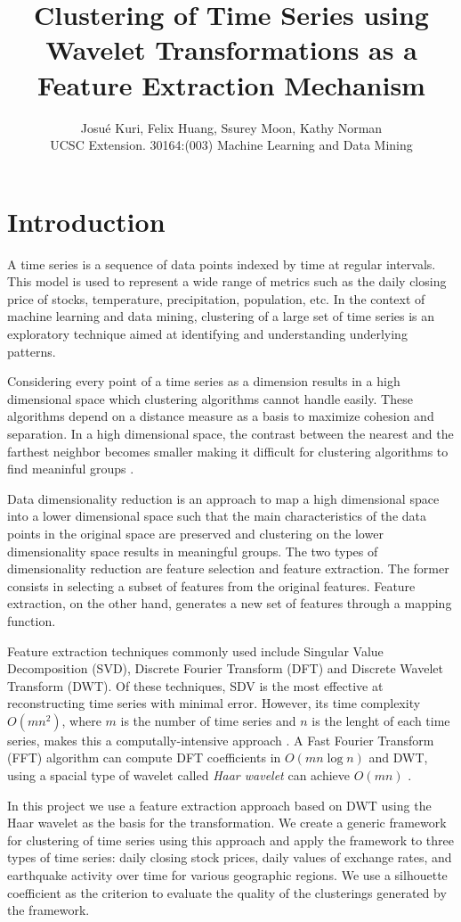 \documentclass{article}
\title{Clustering of Time Series using Wavelet Transformations as a Feature Extraction Mechanism}
\author{\textsf{Josu\'e Kuri, Felix Huang, Ssurey Moon, Kathy Norman}\\UCSC Extension. 30164:(003) Machine Learning and Data Mining}
\begin{document}
\maketitle

\section{Introduction}
A time series is a sequence of data points indexed by time at regular intervals. This model is used to represent a wide range of metrics such as the daily closing price of stocks, temperature, precipitation, population, etc. In the context of machine learning and data mining, clustering of a large set of time series is an exploratory technique aimed at identifying and understanding underlying patterns.

Considering every point of a time series as a dimension results in a high dimensional space which clustering algorithms cannot handle easily. These algorithms depend on a distance measure as a basis to maximize cohesion and separation. In a high dimensional space, the contrast between the nearest and the farthest neighbor becomes smaller making it difficult for clustering algorithms to find meaninful groups \cite{BGRS99}.

Data dimensionality reduction is an approach to map a high dimensional space into a lower dimensional space such that the main characteristics of the data points in the original space are preserved and clustering on the lower dimensionality space results in meaningful groups. The two types of dimensionality reduction are feature selection and feature extraction. The former consists in selecting a subset of features from the original features. Feature extraction, on the other hand, generates a new set of features through a mapping function.

Feature extraction techniques commonly used include Singular Value Decomposition (SVD), Discrete Fourier Transform (DFT) and Discrete Wavelet Transform (DWT). Of these techniques, SDV is the most effective at reconstructing time series with minimal error. However, its time complexity $O(mn^2)$, where $m$ is the number of time series and $n$ is the lenght of each time series, makes this a computally-intensive approach \cite{ZHZL06}. A Fast Fourier Transform (FFT) algorithm can compute DFT coefficients in $O(mn \log n)$ and DWT, using a spacial type of wavelet called {\em Haar wavelet} can achieve $O(mn)$ \cite{ZHZL06}.

In this project we use a feature extraction approach based on DWT using the Haar wavelet as the basis for the transformation. We create a generic framework for clustering of time series using this approach and apply the framework to three types of time series: daily closing stock prices, daily values of exchange rates, and earthquake activity over time for various geographic regions. We use a silhouette coefficient as the criterion to evaluate the quality of the clusterings generated by the framework.
\end{document}
